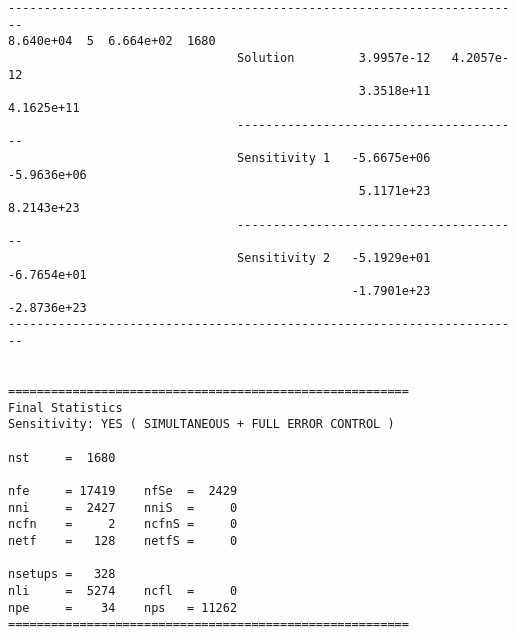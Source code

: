 \begin{verbatim}
------------------------------------------------------------------------
8.640e+04  5  6.664e+02  1680
                                Solution         3.9957e-12   4.2057e-12 
                                                 3.3518e+11   4.1625e+11 
                                ----------------------------------------
                                Sensitivity 1   -5.6675e+06  -5.9636e+06 
                                                 5.1171e+23   8.2143e+23 
                                ----------------------------------------
                                Sensitivity 2   -5.1929e+01  -6.7654e+01 
                                                -1.7901e+23  -2.8736e+23 
------------------------------------------------------------------------


========================================================
Final Statistics
Sensitivity: YES ( SIMULTANEOUS + FULL ERROR CONTROL )

nst     =  1680                

nfe     = 17419    nfSe  =  2429  
nni     =  2427    nniS  =     0  
ncfn    =     2    ncfnS =     0  
netf    =   128    netfS =     0

nsetups =   328                  
nli     =  5274    ncfl  =     0  
npe     =    34    nps   = 11262  
========================================================
\end{verbatim}